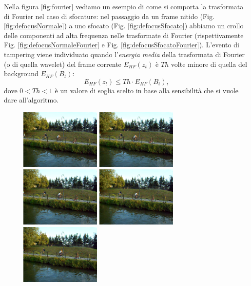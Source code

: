 Nella figura \ref{fig:fourier} vediamo un esempio di come si comporta la trasformata di Fourier nel caso di sfocature: 
nel passaggio da un frame nitido (Fig. \ref{fig:defocusNormale}) a uno sfocato (Fig. \ref{fig:defocusSfocato}) abbiamo un crollo delle componenti ad alta frequenza nelle trasformate di Fourier (rispettivamente Fig. \ref{fig:defocusNormaleFourier} e Fig. \ref{fig:defocusSfocatoFourier}).
L'evento di tampering viene individuato quando l'\textit{energia media} della trasformata di Fourier (o di quella wavelet) del frame corrente $E_{HF}(z_t)$ \`e $Th$ volte minore di quella del background $E_{HF}(B_t)$:
\[E_{HF}(z_t)\leq Th \cdot E_{HF}(B_t),\]
dove $0<Th<1$ \`e  un valore di soglia scelto in base alla sensibilit\`a che si vuole dare all'algoritmo.\\
\begin{figure}
	\centering
	\includegraphics[width = 4cm]{./pictures/FPSalto/img0001}
	\includegraphics[width = 4cm]{./pictures/FPSalto/img0002}
	\includegraphics[width = 4cm]{./pictures/FPSalto/img0003}
	\includegraphics[width = 4cm]{./pictures/FPSalto/img0004}
	\includegraphics[width = 4cm]{./pictures/FPSalto/img0005}

\end{figure}
